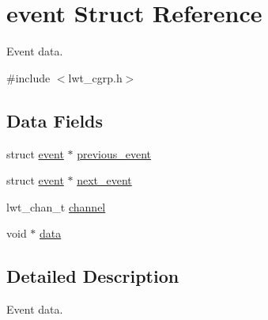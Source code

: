 \hypertarget{structevent}{\section{event Struct Reference}
\label{structevent}
}


Event data.  




{\ttfamily \#include $<$lwt\+\_\+cgrp.\+h$>$}

\subsection*{Data Fields}
\begin{DoxyCompactItemize}
\item 
struct \hyperlink{structevent}{event} $\ast$ \hyperlink{structevent_a7ca44afd32b2c7108a326bf985ad42f7}{previous\+\_\+event}
\item 
struct \hyperlink{structevent}{event} $\ast$ \hyperlink{structevent_a34f5ba824f03b478ad50920c7dde88b9}{next\+\_\+event}
\item 
lwt\+\_\+chan\+\_\+t \hyperlink{structevent_a7d2dcbd71bee4021618e8b1cf852b8e3}{channel}
\item 
void $\ast$ \hyperlink{structevent_a675355462c32d49a652673799ca24209}{data}
\end{DoxyCompactItemize}


\subsection{Detailed Description}
Event data. 

